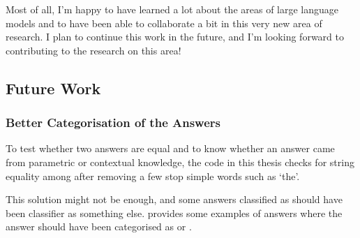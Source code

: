 Most of all, I'm happy to have learned a lot about the areas of large language models and  to have been able to collaborate a bit in this very new area of research.
I plan to continue this work in the future, and I'm looking forward to contributing to the research on this area!

\subsection{Future Work}

\subsubsection{Better Categorisation of the Answers}
\label{other_problems}

To test whether two answers are equal and to know whether an answer came from parametric or contextual knowledge, the code in this thesis checks for string equality among after removing a few stop simple words such as `the'.

This solution might not be enough, and some answers classified as \Other{} should have been classifier as something else.
 provides some examples of answers where the answer should have been categorised as \Parametric{} or \Contextual{}.

